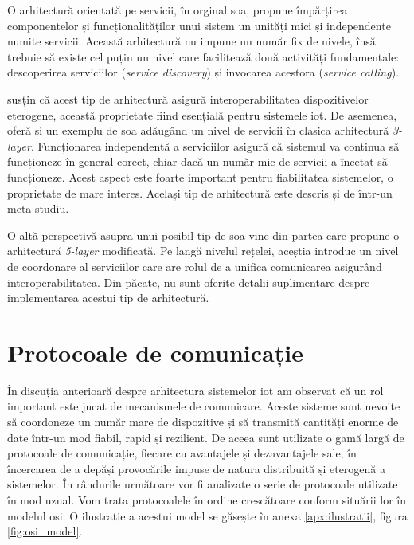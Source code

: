 O arhitectură orientată pe servicii, în orginal \acrfull{soa}, propune împărțirea componentelor și funcționalităților unui sistem un unități mici și independente numite servicii. Această arhitectură nu impune un număr fix de nivele, însă trebuie să existe cel puțin un nivel care facilitează două activități fundamentale: descoperirea serviciilor (\textit{service discovery}) și invocarea acestora (\textit{service calling}). 

\citet{Khodadadi2016} susțin că acest tip de arhitectură asigură interoperabilitatea dispozitivelor eterogene, această proprietate fiind esențială pentru sistemele \acrshort{iot}. De asemenea, oferă și un exemplu de \acrshort{soa} adăugând un nivel de servicii în clasica arhitectură \textit{3-layer}. Funcționarea independentă a serviciilor asigură că sistemul va continua să funcționeze în general corect, chiar dacă un număr mic de servicii a încetat să funcționeze. Acest aspect este foarte important pentru fiabilitatea sistemelor, o proprietate de mare interes. Același tip de arhitectură este descris și de \citet{Lin2017} într-un meta-studiu.

O altă perspectivă asupra unui posibil tip de \acrshort{soa} vine din partea \citet{LuTan2010} care propune o arhitectură \textit{5-layer} modificată. Pe langă nivelul rețelei, aceștia introduc un nivel de coordonare al serviciilor care are rolul de a unifica comunicarea asigurând interoperabilitatea. Din păcate, nu sunt oferite detalii suplimentare despre implementarea acestui tip de arhitectură.

\section{Protocoale de comunicație}

În discuția anterioară despre arhitectura sistemelor \acrshort{iot} am observat că un rol important este jucat de mecanismele de comunicare. Aceste sisteme sunt nevoite să coordoneze un număr mare de dispozitive și să transmită cantități enorme de date într-un mod fiabil, rapid și rezilient. De aceea sunt utilizate o gamă largă de protocoale de comunicație, fiecare cu avantajele și dezavantajele sale, în încercarea de a depăși provocările impuse de natura distribuită și eterogenă a sistemelor. În rândurile următoare vor fi analizate o serie de protocoale utilizate în mod uzual. Vom trata protocoalele în ordine crescătoare conform situării lor în modelul \acrshort{osi}. O ilustrație a acestui model se găsește în anexa \ref{apx:ilustratii}, figura \ref{fig:osi_model}.

